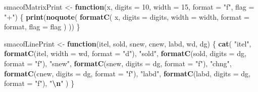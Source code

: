 \documentclass[
  12pt,
]{article}
\newenvironment{Shaded}{\begin{snugshade}}{\end{snugshade}}
\newcommand{\AttributeTok}[1]{\textcolor[rgb]{0.13,0.29,0.53}{#1}}
\newcommand{\ControlFlowTok}[1]{\textcolor[rgb]{0.13,0.29,0.53}{\textbf{#1}}}
\newcommand{\DecValTok}[1]{\textcolor[rgb]{0.00,0.00,0.81}{#1}}
\newcommand{\FunctionTok}[1]{\textcolor[rgb]{0.13,0.29,0.53}{\textbf{#1}}}
\newcommand{\NormalTok}[1]{#1}
\newcommand{\OtherTok}[1]{\textcolor[rgb]{0.56,0.35,0.01}{#1}}
\newcommand{\SpecialCharTok}[1]{\textcolor[rgb]{0.81,0.36,0.00}{\textbf{#1}}}
\newcommand{\StringTok}[1]{\textcolor[rgb]{0.31,0.60,0.02}{#1}}
\begin{document}
\begin{Shaded}
\begin{Highlighting}[]
\NormalTok{smacofMatrixPrint }\OtherTok{\textless{}{-}} \ControlFlowTok{function}\NormalTok{(x,}
                   \AttributeTok{digits =} \DecValTok{10}\NormalTok{,}
                   \AttributeTok{width =} \DecValTok{15}\NormalTok{,}
                   \AttributeTok{format =} \StringTok{"f"}\NormalTok{,}
                   \AttributeTok{flag =} \StringTok{"+"}\NormalTok{) \{}
  \FunctionTok{print}\NormalTok{(}\FunctionTok{noquote}\NormalTok{(}
    \FunctionTok{formatC}\NormalTok{(}
\NormalTok{      x,}
      \AttributeTok{digits =}\NormalTok{ digits,}
      \AttributeTok{width =}\NormalTok{ width,}
      \AttributeTok{format =}\NormalTok{ format,}
      \AttributeTok{flag =}\NormalTok{ flag}
\NormalTok{    )}
\NormalTok{  ))}
\NormalTok{\}}

\NormalTok{smacofLinePrint }\OtherTok{\textless{}{-}} \ControlFlowTok{function}\NormalTok{(itel, sold, snew, cnew, labd, wd, dg) \{}
  \FunctionTok{cat}\NormalTok{(}
    \StringTok{"itel"}\NormalTok{,}
    \FunctionTok{formatC}\NormalTok{(itel, }\AttributeTok{width =}\NormalTok{ wd, }\AttributeTok{format =} \StringTok{"d"}\NormalTok{),}
    \StringTok{"sold"}\NormalTok{,}
    \FunctionTok{formatC}\NormalTok{(sold, }\AttributeTok{digits =}\NormalTok{ dg, }\AttributeTok{format =} \StringTok{"f"}\NormalTok{),}
    \StringTok{"snew"}\NormalTok{,}
    \FunctionTok{formatC}\NormalTok{(snew, }\AttributeTok{digits =}\NormalTok{ dg, }\AttributeTok{format =} \StringTok{"f"}\NormalTok{),}
    \StringTok{"chng"}\NormalTok{,}
    \FunctionTok{formatC}\NormalTok{(cnew, }\AttributeTok{digits =}\NormalTok{  dg, }\AttributeTok{format =} \StringTok{"f"}\NormalTok{),}
    \StringTok{"labd"}\NormalTok{,}
    \FunctionTok{formatC}\NormalTok{(labd, }\AttributeTok{digits =}\NormalTok{  dg, }\AttributeTok{format =} \StringTok{"f"}\NormalTok{),}
    \StringTok{"}\SpecialCharTok{\textbackslash{}n}\StringTok{"}
\NormalTok{  )}
\NormalTok{\}}


\end{Highlighting}
\end{Shaded}
\end{document}
